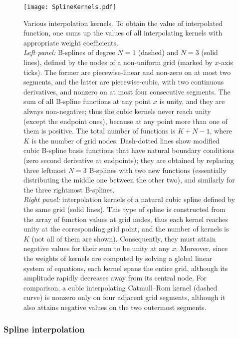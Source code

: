 \documentclass[12pt]{article}
\begin{document}
\begin{figure}
\begin{center}
\texttt{[image: SplineKernels.pdf]}
\end{center}
\caption{Various interpolation kernels. To obtain the value of interpolated function, one sums up the values of all interpolating kernels with appropriate weight coefficients. \protect\\
\textit{Left panel:} B-splines of degree $N=1$ (dashed) and $N=3$ (solid lines), defined by the nodes of a non-uniform grid (marked by $x$-axis ticks). The former are piecewise-linear and non-zero on at most two segments, and the latter are piecewise-cubic, with two continuous derivatives, and nonzero on at most four consecutive segments. The sum of all B-spline functions at any point $x$ is unity, and they are always non-negative; thus the cubic kernels never reach unity (except the endpoint ones), because at any point more than one of them is positive.
The total number of functions is $K+N-1$, where $K$ is the number of grid nodes.
Dash-dotted lines show modified cubic B-spline basis functions that have natural boundary conditions (zero second derivative at endpoints); they are obtained by replacing three leftmost $N=3$ B-splines with two new functions (essentially distributing the middle one between the other two), and similarly for the three rightmost B-splines.\protect\\
\textit{Right panel:} interpolation kernels of a natural cubic spline defined by the same grid (solid lines). This type of spline is constructed from the array of function values at grid nodes, thus each kernel reaches unity at the corresponding grid point, and the number of kernels is $K$ (not all of them are shown). Consequently, they must attain negative values for their sum to be unity at any $x$. Moreover, since the weights of kernels are computed by solving a global linear system of equations, each kernel spans the entire grid, although its amplitude rapidly decreases away from its central node. For comparison, a cubic interpolating Catmull--Rom kernel (dashed curve) is nonzero only on four adjacent grid segments, although it also attains negative values on the two outermost segments. } \label{fig:SplineKernels}
\end{figure}


\subsubsection{Spline interpolation}  \label{sec:MathSplineDetails}
\end{document}
